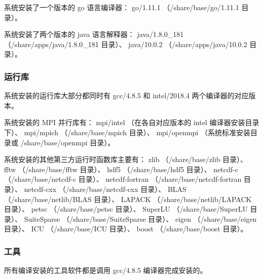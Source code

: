 \documentclass[UTF8]{ctexart}
\begin{document}
系统安装了一个版本的 go 语言编译器：\newline
go/1.11.1 （/share/base/go/1.11.1 目录）。
\bigskip

系统安装了两个版本的 java 语言解释器：\newline
java/1.8.0\_181 （/share/apps/java/1.8.0\_181 目录）、\newline
java/10.0.2 （/share/apps/java/10.0.2 目录）。

\subsubsection{运行库}
系统安装的运行库大部分都同时有 gcc/4.8.5 和 intel/2018.4 两个编译器的对应版本。
\bigskip

系统安装的 MPI 并行库有：\newline
mpi/intel （在各自对应版本的 intel 编译器安装目录下）、\newline
mpi/mpich （/share/base/mpich 目录）、\newline
mpi/openmpi （系统标准安装目录或 /share/base/openmpi 目录）。
\bigskip

系统安装的其他第三方运行时函数库主要有：\newline
zlib （/share/base/zlib 目录）、\newline
fftw （/share/base/fftw 目录）、\newline
hdf5 （/share/base/hdf5 目录）、\newline
netcdf-c （/share/base/netcdf-c 目录）、\newline
netcdf-fortran （/share/base/netcdf-fortran 目录）、\newline
netcdf-cxx （/share/base/netcdf-cxx 目录）、\newline
BLAS （/share/base/netlib/BLAS 目录）、\newline
LAPACK （/share/base/netlib/LAPACK 目录）、\newline
petsc （/share/base/petsc 目录）、\newline
SuperLU （/share/base/SuperLU 目录）、\newline
SuiteSparse （/share/base/SuiteSparse 目录）、\newline
eigen （/share/base/eigen 目录）、\newline
ICU （/share/base/ICU 目录）、\newline
boost （/share/base/boost 目录）。

\subsubsection{工具}
所有编译安装的工具软件都是调用 gcc/4.8.5 编译器完成安装的。
\bigskip
\end{document}
